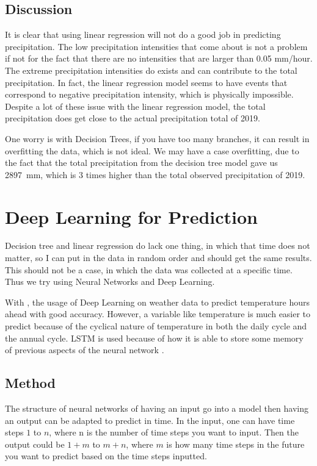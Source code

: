\documentclass[11pt]{report}
\begin{document}
\subsection{Discussion}
It is clear that using linear regression will not do a good job in
predicting precipitation. The low precipitation intensities that come
about is not a problem if not for the fact that there are no intensities
that are larger than 0.05 mm/hour. The extreme precipitation intensities
do exists and can contribute to the total precipitation. In fact, the
linear regression model seems to have events that correspond to negative
precipitation intensity, which is physically impossible. Despite a lot of
these issue with the linear regression model, the total precipitation
does get close to the actual precipitation total of 2019. 

One worry is with Decision Trees, if you have too many branches, it can
result in overfitting the data, which is not ideal. We may have a case
overfitting, due to the fact that the total precipitation from the decision tree model gave us 2897~mm, which is 3 times higher than the total observed precipitation of 2019.


\clearpage

\section{Deep Learning for Prediction}\label{sec:neural}

Decision tree and linear regression do lack one thing, in which that time does not matter, so I can put in the data in random order and should get the same results. This should not be a case, in which the data was collected at a specific time. Thus we try using Neural Networks and Deep Learning. 

With \cite{Norway}, the usage of Deep Learning on weather data to 
predict temperature hours ahead with good accuracy. However, a variable like temperature is much easier to predict because of the cyclical nature of temperature in both the daily cycle and the annual cycle. LSTM is used because of how it is able to store some memory of previous aspects of the neural network \cite[]{LSTM}.  
\subsection{Method}
The structure of neural networks of having an input go into a model then having an output can be adapted to predict in time. In the input, one can have time steps $1 $ to $n$, where n is the number of time steps you want to input. Then the output could be $1+ m$ to $m+n$, where $m$ is how many time steps in the future you want to predict based on the time steps inputted.  
\end{document}
